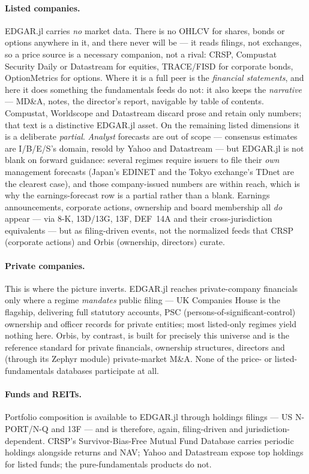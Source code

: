 \documentclass[11pt,a4paper]{report}
\begin{document}
\paragraph{Listed companies.} EDGAR.jl carries \emph{no} market data. There is no OHLCV for shares,
bonds or options anywhere in it, and there never will be --- it reads filings, not exchanges, so a
price source is a necessary companion, not a rival: CRSP, Compustat Security Daily or Datastream for
equities, TRACE/FISD for corporate bonds, OptionMetrics for options. Where it is a full peer is the
\emph{financial statements}, and here it does something the fundamentals feeds do not: it also keeps
the \emph{narrative} --- MD\&A, notes, the director's report, navigable by table of contents.
Compustat, Worldscope and Datastream discard prose and retain only numbers; that text is a distinctive
EDGAR.jl asset. On the remaining listed dimensions it is a deliberate \emph{partial}. \emph{Analyst}
forecasts are out of scope --- consensus estimates are I/B/E/S's domain, resold by Yahoo and
Datastream --- but EDGAR.jl is not blank on forward guidance: several regimes require issuers to file
their \emph{own} management forecasts (Japan's EDINET and the Tokyo exchange's TDnet are the clearest
case), and those company-issued numbers are within reach, which is why the earnings-forecast row is a
partial rather than a blank. Earnings announcements, corporate actions, ownership and board membership
all \emph{do} appear --- via 8-K, 13D/13G, 13F, DEF~14A and their cross-jurisdiction equivalents ---
but as filing-driven events, not the normalized feeds that CRSP (corporate actions) and Orbis
(ownership, directors) curate.

\paragraph{Private companies.} This is where the picture inverts. EDGAR.jl reaches private-company
financials only where a regime \emph{mandates} public filing --- UK Companies House is the flagship,
delivering full statutory accounts, PSC (persons-of-significant-control) ownership and officer
records for private entities; most listed-only regimes yield nothing here. Orbis, by contrast, is
built for precisely this universe and is the reference standard for private financials, ownership
structures, directors and (through its Zephyr module) private-market M\&A. None of the price- or
listed-fundamentals databases participate at all.

\paragraph{Funds and REITs.} Portfolio composition is available to EDGAR.jl through holdings filings
--- US N-PORT/N-Q and 13F --- and is therefore, again, filing-driven and jurisdiction-dependent.
CRSP's Survivor-Bias-Free Mutual Fund Database carries periodic holdings alongside returns and NAV;
Yahoo and Datastream expose top holdings for listed funds; the pure-fundamentals products do not.
\end{document}

